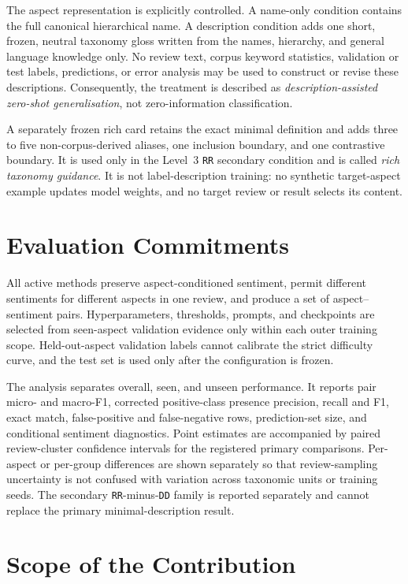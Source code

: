 The aspect representation is explicitly controlled. A name-only condition
contains the full canonical hierarchical name. A description condition adds
one short, frozen, neutral taxonomy gloss written from the names, hierarchy,
and general language knowledge only. No review text, corpus keyword
statistics, validation or test labels, predictions, or error analysis may be
used to construct or revise these descriptions. Consequently, the treatment is
described as \emph{description-assisted zero-shot generalisation}, not
zero-information classification.

A separately frozen rich card retains the exact minimal definition and adds
three to five non-corpus-derived aliases, one inclusion boundary, and one
contrastive boundary. It is used only in the Level~3 \texttt{RR} secondary
condition and is called \emph{rich taxonomy guidance}. It is not
label-description training: no synthetic target-aspect example updates model
weights, and no target review or result selects its content.

\section{Evaluation Commitments}

All active methods preserve aspect-conditioned sentiment, permit different
sentiments for different aspects in one review, and produce a set of
aspect--sentiment pairs. Hyperparameters, thresholds, prompts, and checkpoints
are selected from seen-aspect validation evidence only within each outer
training scope. Held-out-aspect validation labels cannot calibrate the strict
difficulty curve, and the test set is used only after the configuration is
frozen.

The analysis separates overall, seen, and unseen performance. It reports pair
micro- and macro-F1, corrected positive-class presence precision, recall and
F1, exact match, false-positive and false-negative rows, prediction-set size,
and conditional sentiment diagnostics. Point estimates are accompanied by
paired review-cluster confidence intervals for the registered primary
comparisons. Per-aspect or per-group differences are shown separately so that
review-sampling uncertainty is not confused with variation across taxonomic
units or training seeds. The secondary \texttt{RR}-minus-\texttt{DD} family is
reported separately and cannot replace the primary minimal-description result.

\section{Scope of the Contribution}

